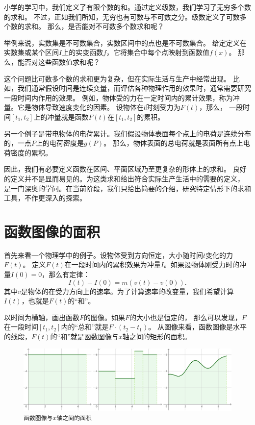 \documentclass[12pt,UTF8]{ctexbook}
\begin{document}
小学的学习中，我们定义了有限个数的和。通过定义级数，我们学习了无穷多个数的求和。
不过，正如我们所知，无穷也有可数与不可数之分。级数定义了可数多个数的求和。
那么，是否能对不可数多个数求和呢？

举例来说，实数集是不可数集合，实数区间中的点也是不可数集合。
给定定义在实数集或某个区间$I$上的实变函数$f$，它将集合中每个点映射到函数值$f(x)$。
那么，能否对这些函数值求和呢？

这个问题比可数多个数的求和更为复杂，但在实际生活与生产中经常出现。
比如，我们通常假设时间是连续变量，而评估各种物理作用的效果时，通常需要研究一段时间内作用的效果。
例如，物体受的力在一定时间内的累计效果，称为冲量。它是物体导致速度变化的因素。
设物体在$t$时刻受力为$F(t)$，那么，
一段时间$[t_1, t_2]$上的冲量就是函数$F(t)$在$[t_1, t_2]$的累积。

另一个例子是带电物体的电荷累计。我们假设物体表面每个点上的电荷是连续分布的，一点$P$上的电荷密度是$g(P)$。
那么，物体表面的总电荷就是表面所有点上电荷密度的累积。

因此，我们有必要定义函数在区间、平面区域乃至更复杂的形体上的求和。
良好的定义并不是显而易见的。为这类求和给出符合实际生产生活中的需要的定义，
是一门深奥的学问。在当前阶段，我们只给出简要的介绍，研究特定情形下的求和工具，不作更深入的探索。

\section{函数图像的面积}

首先来看一个物理学中的例子。设物体受到方向恒定，大小随时间$t$变化的力$F(t)$。
定义$F(t)$在一段时间内的累积效果为冲量$I$。如果设物体刚受力时的冲量$I(0) = 0$，那么有定律：
$$ I(t) - I(0) = m(v(t) - v(0)).$$
其中$v$是物体的在受力方向上的速率。为了计算速率的改变量，我们希望计算$I(t)$，也就是$F(t)$的“和”。

以时间为横轴，画出函数$F$的图像。如果$F$的大小也是恒定的，
那么可以发现，$F$在一段时间$[t_1, t_2]$内的“总和”就是$F \cdot (t_2 - t_1)$。
从图像来看，函数图像是水平的线段，$F(t)$的“和”就是函数图像与$x$轴之间的矩形的面积。

\begin{figure}[h] %
    \vspace{4pt}
    \centering
    \includegraphics[width=\textwidth]{tu/积分定义1.png}
    \caption*{\texttt{函数图像与$x$轴之间的面积}}
\end{figure}
\end{document}
